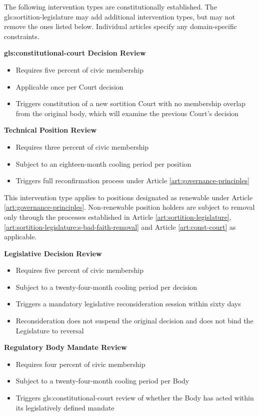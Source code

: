 The following intervention types are constitutionally established. The \gls{gls:sortition-legislature} may add additional intervention types, but may not remove the ones listed below. Individual articles specify any domain-specific constraints.

\textbf{\gls{gls:constitutional-court} Decision Review}
\begin{itemize}
  \item Requires five percent of civic membership
  \item Applicable once per Court decision
  \item Triggers constitution of a new sortition Court with no membership overlap from the original body, which will examine the previous Court's decision
\end{itemize}

\textbf{Technical Position Review}
\begin{itemize}
  \item Requires three percent of civic membership
  \item Subject to an eighteen-month cooling period per position
  \item Triggers full reconfirmation process under Article \ref{art:governance-principles}
\end{itemize}
This intervention type applies to positions designated as renewable under Article \ref{art:governance-principles}. Non-renewable position holders are subject to removal only through the processes established in Article \ref{art:sortition-legislature}, \ref{art:sortition-legislature:s-bad-faith-removal} and Article \ref{art:const-court} as applicable.

\textbf{Legislative Decision Review}
\begin{itemize}
  \item Requires five percent of civic membership
  \item Subject to a twenty-four-month cooling period per decision
  \item Triggers a mandatory legislative reconsideration session within sixty days
  \item Reconsideration does not suspend the original decision and does not bind the Legislature to reversal
\end{itemize}

\textbf{Regulatory Body Mandate Review}
\begin{itemize}
  \item Requires four percent of civic membership
  \item Subject to a twenty-four-month cooling period per Body
  \item Triggers \gls{gls:constitutional-court} review of whether the Body has acted within its legislatively defined mandate
\end{itemize}

